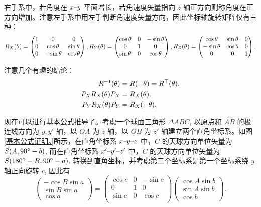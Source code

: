 \documentclass[UTF8, 12pt, a4paper, oneside, onecolumn, fontset=none]{ctexart}
\begin{document}
右手系中，若角度在 $x\text{\textendash}y$ 平面增长，若角速度矢量指向 $z$ 轴正方向则称角度在正方向增加。注意左手系中用左手判断角速度矢量方向，因此坐标轴旋转矩阵仅有三种：
\begin{equation}
R_{X}\mleft(\theta\mright)=
\begin{pmatrix}
1 & 0 & 0\\
0 & \cos{\theta} & \sin{\theta}\\
0 & -\sin{\theta} & \cos{\theta}\\
\end{pmatrix},
R_{Y}\mleft(\theta\mright)=
\begin{pmatrix}
\cos{\theta} & 0 & -\sin{\theta}\\
0 & 1 & 0\\
\sin{\theta} & 0 & \cos{\theta}\\
\end{pmatrix},
R_{Z}\mleft(\theta\mright)=
\begin{pmatrix}
\cos{\theta} & \sin{\theta} & 0\\
-\sin{\theta} & \cos{\theta} & 0\\
0 & 0 & 1
\end{pmatrix}.
\end{equation}

注意几个有趣的结论：
\begin{align}
R^{-1}\mleft(\theta\mright)&=R\mleft(-\theta\mright)=R^{\top}\mleft(\theta\mright).\\
P_{X}R_{X}\mleft(\theta\mright) P_{X}&=R_{X}\mleft(\theta\mright).\\
P_{Y}R_{X}\mleft(\theta\mright) P_{Y}&=R_{X}\mleft(-\theta\mright).
\end{align}

现在可以进行基本公式推导了。考虑一个球面三角形 $\Delta{}ABC$, 以原点和 $\overset{\frown}{AB}$ 的极连线方向为 $y, y'$ 轴，以 $OA$ 为 $z$ 轴，以 $OB$ 为 $z'$ 轴建立两个直角坐标系。如图\ref{基本公式证明。}所示，在直角坐标系 $x\text{\textendash}y\text{\textendash}z$ 中，$C$ 的天球方向单位矢量为 $\vec{S}\mleft(A,\ang{90;;}-b\mright)$, 而在直角坐标系 $x'\text{\textendash}y'\text{\textendash}z'$ 中，$C$ 的天球方向单位矢量为 $\vec{S}\mleft(\ang{180;;}-B,\ang{90;;}-a\mright)$. 转换到直角坐标，并考虑第二个坐标系是第一个坐标系绕 $y$ 轴正向旋转 $c$, 因此有
\begin{equation}
\begin{pmatrix}
-\cos{B}\sin{a}\\
\sin{B}\sin{a}\\
\cos{a}
\end{pmatrix}=
\begin{pmatrix}
\cos{c} & 0 & -\sin{c}\\
0 & 1 & 0\\
\sin{c} & 0 & \cos{c}\\
\end{pmatrix}
\begin{pmatrix}
\cos{A}\sin{b}\\
\sin{A}\sin{b}\\
\cos{b}
\end{pmatrix}.
\end{equation}
\end{document}
